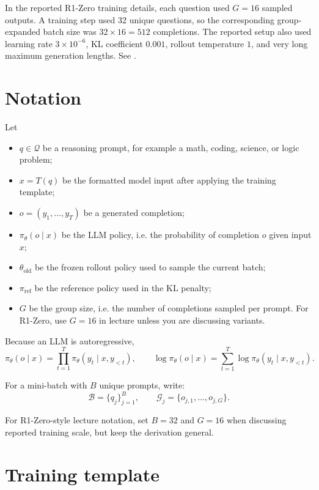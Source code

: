 \documentclass[11pt]{article}
\newcommand{\old}{\mathrm{old}}
\newcommand{\refm}{\mathrm{ref}}
\begin{document}
In the reported R1-Zero training details, each question used $G=16$ sampled outputs. A training step used 32 unique questions, so the corresponding group-expanded batch size was $32\times 16=512$ completions. The reported setup also used learning rate $3\times 10^{-6}$, KL coefficient $0.001$, rollout temperature $1$, and very long maximum generation lengths. See \cite{guo2025nature}.

\section{Notation}

Let
\begin{itemize}[leftmargin=*]
  \item $q \in \mathcal{Q}$ be a reasoning prompt, for example a math, coding, science, or logic problem;
  \item $x=T(q)$ be the formatted model input after applying the training template;
  \item $o=(y_1,\ldots,y_T)$ be a generated completion;
  \item $\pi_\theta(o\mid x)$ be the LLM policy, i.e. the probability of completion $o$ given input $x$;
  \item $\theta_{\old}$ be the frozen rollout policy used to sample the current batch;
  \item $\pi_{\refm}$ be the reference policy used in the KL penalty;
  \item $G$ be the group size, i.e. the number of completions sampled per prompt. For R1-Zero, use $G=16$ in lecture unless you are discussing variants.
\end{itemize}

Because an LLM is autoregressive,
\begin{equation}
\pi_\theta(o\mid x)
= \prod_{t=1}^{T} \pi_\theta(y_t\mid x,y_{<t}),
\qquad
\log \pi_\theta(o\mid x)
= \sum_{t=1}^{T} \log \pi_\theta(y_t\mid x,y_{<t}).
\end{equation}

For a mini-batch with $B$ unique prompts, write:
\begin{equation}
\mathcal{B}=\{q_j\}_{j=1}^{B},
\qquad
\mathcal{G}_j=\{o_{j,1},\ldots,o_{j,G}\}.
\end{equation}

For R1-Zero-style lecture notation, set $B=32$ and $G=16$ when discussing reported training scale, but keep the derivation general.

\section{Training template}
\end{document}

